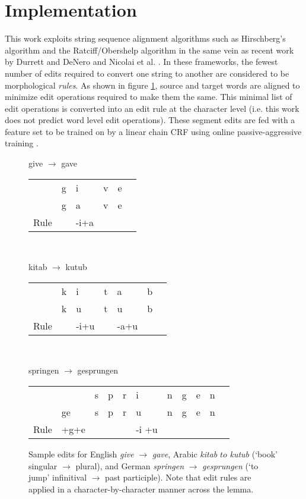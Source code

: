 \documentclass[11pt]{article}
\begin{document}
\section*{Implementation}
This work exploits string sequence alignment algorithms such as Hirschberg's algorithm \cite{hirschberg1975linear} and the Ratciff/Obershelp algorithm \cite{black2004ratcliff} in the same vein as recent work by Durrett and DeNero  and Nicolai et al. .
In these frameworks, the fewest number of edits required to convert one string to another are considered to be morphological \emph{rules}. 
As shown in figure \ref{fig:edits}, source and target words are aligned to minimize edit operations required to make them the same. 
This minimal list of edit operations is converted into an edit rule at the character level (i.e. this work does not predict word level edit operations).
These segment edits are fed with a feature set to be trained on by a linear chain CRF \cite{sutton2011introduction} using online passive-aggressive training \cite{crammer2006online}.
\begin{figure}
	\begin{flushleft}give $\to$ gave\end{flushleft}
	\begin{tabular}{l|l|l|l|l|l}
        \hline
		&	g	&	i	&	v	&	e	& \\
        &	g	&	a	&	v	&	e	& \\\hline
        Rule	&&	-i+a	&		&		& \\        
    \end{tabular}\\
    
    \begin{flushleft}kitab $\to$ kutub \end{flushleft}
    \begin{tabular}{l|l|l|l|l|l|l}
	\hline
      &	k	&	i	&	t	&	a	&	b&\\
      &	k	&	u	&	t	&	u	&	b&\\\hline
      Rule	&&	-i+u	&		&	-a+u	&	&\\        
    \end{tabular}\\
    
    \begin{flushleft}springen $\to$ gesprungen\end{flushleft}
	\begin{tabular}{l|l|l|l|l|l|l|l|l|l|l}
    \hline
     &  & s	&	p	&	r	&i	&	n	&	g	&	e	&	n&\\
     & ge & s	&	p	&	r &	u	&	n	&	g	&	e	& n&\\\hline
      Rule &	+g+e&		& &		&-i +u	&  &  &\\        
    \end{tabular}

    \caption{Sample edits for English \emph{give} $\to$ \emph{gave}, Arabic \emph{kitab} $to$ \emph{kutub} (`book' singular $\to$ plural), and German \emph{springen} $\to$ \emph{gesprungen} (`to jump' infinitival $\to$ past participle). Note that edit rules are applied in a character-by-character manner across the lemma.}
	\label{fig:edits}
\end{figure}
\end{document}

